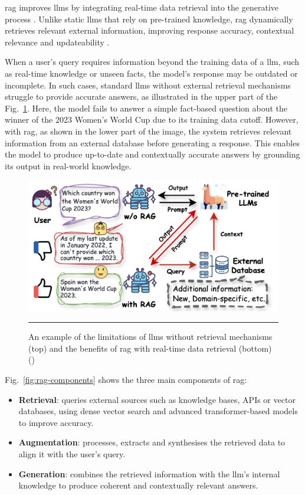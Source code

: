 \acrfull{rag} improves \glspl{llm} by integrating real-time data retrieval into the generative process \cite{singh2025}.
Unlike static \glspl{llm} that rely on pre-trained knowledge, \gls{rag} dynamically retrieves relevant external information, improving response accuracy, contextual relevance and updateability \cite{Fan2024, singh2025}.

When a user's query requires information beyond the training data of a \gls{llm}, such as real-time knowledge or unseen facts, the model's response may be outdated or incomplete.
In such cases, standard \glspl{llm} without external retrieval mechanisms struggle to provide accurate answers, as illustrated in the upper part of the Fig.~\ref{fig:rag-no-rag-example}.
Here, the model fails to answer a simple fact-based question about the winner of the 2023 Women's World Cup due to its training data cutoff.
However, with \gls{rag}, as shown in the lower part of the image, the system retrieves relevant information from an external database before generating a response.
This enables the model to produce up-to-date and contextually accurate answers by grounding its output in real-world knowledge.

\begin{figure}[htbp]
    \centering
 \includegraphics[width=.7\textwidth]{figures/literature-review/rag-no-rag-example.png}
     \rule{35em}{0.5pt}
    \caption{An example of the limitations of \glspl{llm} without retrieval mechanisms (top) and the benefits of \gls{rag} with real-time data retrieval (bottom) (\textcite{Fan2024})}
 \label{fig:rag-no-rag-example}
\end{figure}

Fig.~\ref{fig:rag-components} shows the three main components of \gls{rag}:
\begin{itemize}
    \item \textbf{Retrieval}: queries external sources such as knowledge bases, APIs or vector databases, using dense vector search and advanced transformer-based models to improve accuracy.
	\item \textbf{Augmentation}: processes, extracts and synthesises the retrieved data to align it with the user's query.
	\item \textbf{Generation}: combines the retrieved information with the \gls{llm}'s internal knowledge to produce coherent and contextually relevant answers. 
\end{itemize}
	

